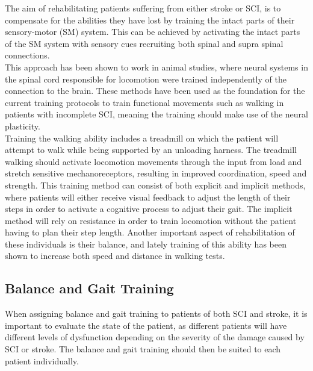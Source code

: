 The aim of rehabilitating patients suffering from either stroke or SCI, is to compensate for the abilities they have lost by training the intact parts of their sensory-motor (SM) system. This can be achieved by activating the intact parts of the SM system with sensory cues recruiting both spinal and supra spinal connections. \cite{Sandrini2018}\\
This approach has been shown to work in animal studies, where neural systems in the spinal cord responsible for locomotion were trained independently of the connection to the brain. These methods have been used as the foundation for the current training protocols to train functional movements such as walking in patients with incomplete SCI, meaning the training should make use of the neural plasticity. \cite{Sandrini2018}\\
Training the walking ability includes a treadmill on which the patient will attempt to walk while being supported by an unloading harness. The treadmill walking should activate locomotion movements through the input from load and stretch sensitive mechanoreceptors, resulting in improved coordination, speed and strength. This training method can consist of both explicit and implicit methods, where patients will either receive visual feedback to adjust the length of their steps in order to activate a cognitive process to adjust their gait. The implicit method will rely on resistance in order to train locomotion without the patient having to plan their step length. Another important aspect of rehabilitation of these individuals is their balance, and lately training of this ability has been shown to increase both speed and distance in walking tests. \cite{Sandrini2018}

\subsection{Balance and Gait Training}

When assigning balance and gait training to patients of both SCI and stroke, it is important to evaluate the state of the patient, as different patients will have different levels of dysfunction depending on the severity of the damage caused by SCI or stroke. The balance and gait training should then be suited to each patient individually. \cite{Sandrini2018}

